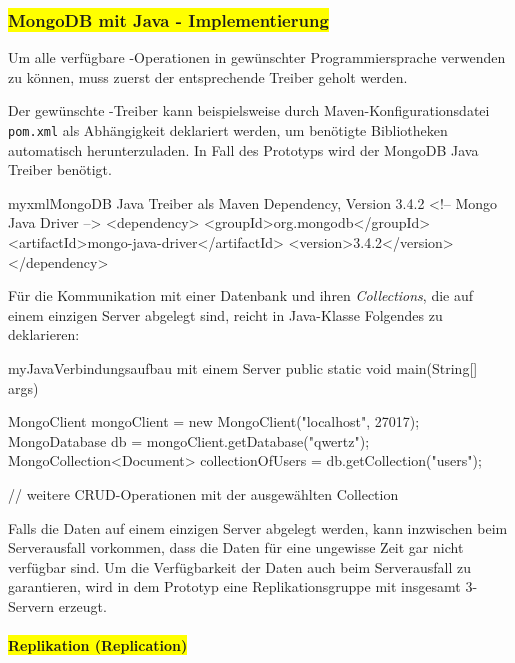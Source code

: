 \subsubsection{\colorbox{yellow}{MongoDB mit Java - Implementierung}}

Um alle verfügbare \mongo-Operationen in gewünschter Programmiersprache verwenden zu können, muss zuerst der entsprechende Treiber geholt werden.

Der gewünschte \mongo-Treiber kann beispielsweise durch Maven-Konfigurationsdatei \texttt{pom.xml} als Abhängigkeit deklariert werden, um benötigte Bibliotheken automatisch herunterzuladen. In Fall des Prototyps wird der MongoDB Java Treiber benötigt.

\begin{listingsboxJava}[label={lst:pom}]{myxml}{MongoDB Java Treiber als Maven Dependency, Version 3.4.2}
	<!-- Mongo Java Driver -->
	<dependency>
		<groupId>org.mongodb</groupId>
		<artifactId>mongo-java-driver</artifactId>
		<version>3.4.2</version>
	</dependency>
\end{listingsboxJava}

Für die Kommunikation mit einer Datenbank und ihren \textit{Collections}, die auf einem einzigen Server abgelegt sind, reicht in Java-Klasse Folgendes zu deklarieren:
\begin{listingsboxJava}[label={lst:conn}]{myJava}{Verbindungsaufbau mit einem Server}
public static void main(String[] args) {

	MongoClient mongoClient = new MongoClient("localhost", 27017);
	MongoDatabase db = mongoClient.getDatabase("qwertz");
	MongoCollection<Document> collectionOfUsers = db.getCollection("users");
        
        // weitere CRUD-Operationen mit der ausgewählten Collection
}
\end{listingsboxJava}

Falls die Daten auf einem einzigen Server abgelegt werden, kann inzwischen beim Serverausfall vorkommen, dass die Daten für eine ungewisse Zeit gar nicht verfügbar sind. Um die Verfügbarkeit der Daten auch beim Serverausfall zu garantieren, wird in dem Prototyp eine Replikationsgruppe mit insgesamt  3-Servern erzeugt.

\paragraph{\colorbox{yellow}{Replikation (Replication)}}

